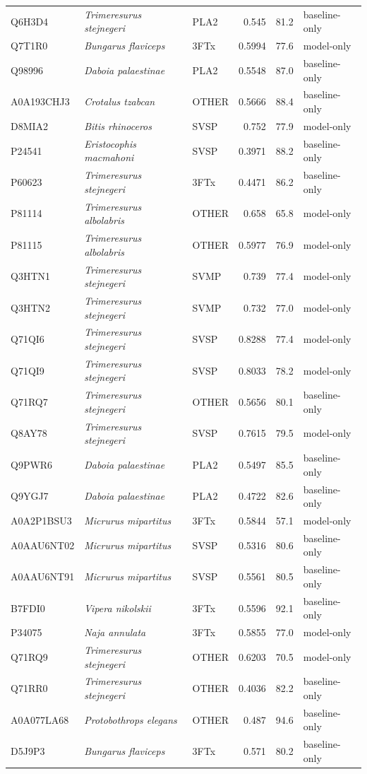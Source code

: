 \documentclass[11pt]{article}
\begin{document}
\begin{longtable}{l l l r r l}
Q6H3D4 & \textit{Trimeresurus stejnegeri} & PLA2 & 0.545 & 81.2 & baseline-only \\
Q7T1R0 & \textit{Bungarus flaviceps} & 3FTx & 0.5994 & 77.6 & model-only \\
Q98996 & \textit{Daboia palaestinae} & PLA2 & 0.5548 & 87.0 & baseline-only \\
A0A193CHJ3 & \textit{Crotalus tzabcan} & OTHER & 0.5666 & 88.4 & baseline-only \\
D8MIA2 & \textit{Bitis rhinoceros} & SVSP & 0.752 & 77.9 & model-only \\
P24541 & \textit{Eristocophis macmahoni} & SVSP & 0.3971 & 88.2 & baseline-only \\
P60623 & \textit{Trimeresurus stejnegeri} & 3FTx & 0.4471 & 86.2 & baseline-only \\
P81114 & \textit{Trimeresurus albolabris} & OTHER & 0.658 & 65.8 & model-only \\
P81115 & \textit{Trimeresurus albolabris} & OTHER & 0.5977 & 76.9 & model-only \\
Q3HTN1 & \textit{Trimeresurus stejnegeri} & SVMP & 0.739 & 77.4 & model-only \\
Q3HTN2 & \textit{Trimeresurus stejnegeri} & SVMP & 0.732 & 77.0 & model-only \\
Q71QI6 & \textit{Trimeresurus stejnegeri} & SVSP & 0.8288 & 77.4 & model-only \\
Q71QI9 & \textit{Trimeresurus stejnegeri} & SVSP & 0.8033 & 78.2 & model-only \\
Q71RQ7 & \textit{Trimeresurus stejnegeri} & OTHER & 0.5656 & 80.1 & baseline-only \\
Q8AY78 & \textit{Trimeresurus stejnegeri} & SVSP & 0.7615 & 79.5 & model-only \\
Q9PWR6 & \textit{Daboia palaestinae} & PLA2 & 0.5497 & 85.5 & baseline-only \\
Q9YGJ7 & \textit{Daboia palaestinae} & PLA2 & 0.4722 & 82.6 & baseline-only \\
A0A2P1BSU3 & \textit{Micrurus mipartitus} & 3FTx & 0.5844 & 57.1 & model-only \\
A0AAU6NT02 & \textit{Micrurus mipartitus} & SVSP & 0.5316 & 80.6 & baseline-only \\
A0AAU6NT91 & \textit{Micrurus mipartitus} & SVSP & 0.5561 & 80.5 & baseline-only \\
B7FDI0 & \textit{Vipera nikolskii} & 3FTx & 0.5596 & 92.1 & baseline-only \\
P34075 & \textit{Naja annulata} & 3FTx & 0.5855 & 77.0 & model-only \\
Q71RQ9 & \textit{Trimeresurus stejnegeri} & OTHER & 0.6203 & 70.5 & model-only \\
Q71RR0 & \textit{Trimeresurus stejnegeri} & OTHER & 0.4036 & 82.2 & baseline-only \\
A0A077LA68 & \textit{Protobothrops elegans} & OTHER & 0.487 & 94.6 & baseline-only \\
D5J9P3 & \textit{Bungarus flaviceps} & 3FTx & 0.571 & 80.2 & baseline-only \\
\hline\hline\end{longtable}
\end{document}
